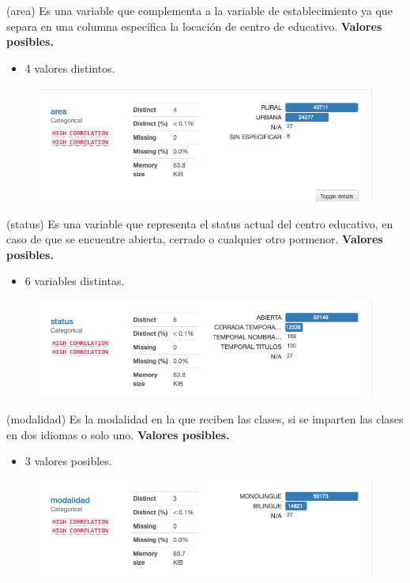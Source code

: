 \begin{variable}(area) 
Es una variable que complementa a la variable de establecimiento ya que separa en una columna específica la locación de centro de educativo.
\bigbreak 
\textbf{Valores posibles.}
\begin{itemize}
	\item 4 valores distintos. 
\end{itemize}
\begin{figure}[H]
	\centering
	\includegraphics[scale=0.5]{Images/10}
\end{figure}
\end{variable}


\begin{variable}(status) 
Es una variable que representa el status actual del centro educativo, en caso de que se encuentre abierta, cerrado o cualquier otro pormenor.
\bigbreak 
\textbf{Valores posibles.}
\begin{itemize}
	\item 6 variables distintas.
\end{itemize}
\begin{figure}[H]
	\centering
	\includegraphics[scale=0.5]{Images/11}
\end{figure}
\end{variable}


\begin{variable}(modalidad) 
Es la modalidad en la que reciben las clases, si se imparten las clases en dos idiomas o solo uno. 
\bigbreak 
\textbf{Valores posibles.}
\begin{itemize}
	\item 3 valores posibles. 
\end{itemize}
\begin{figure}[H]
	\centering
	\includegraphics[scale=0.5]{Images/12}
\end{figure}
\end{variable}

